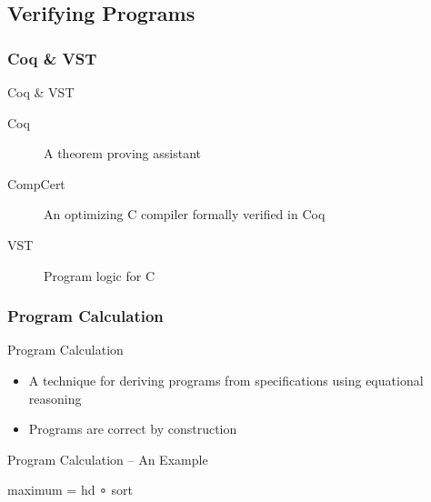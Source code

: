 \documentclass{beamer}
\begin{document}
  \subsection{Verifying Programs}
  \tableofcontents[
    sectionstyle=show/shaded,
    subsectionstyle=show/shaded,
    subsubsectionstyle=show/show/hide/hide,
  ]

  \subsubsection{Coq \& VST}
  \begin{frame}{Coq \& VST}
    \begin{description}
      \item[Coq] A theorem proving assistant
      \item[CompCert] An optimizing C compiler formally verified in
        Coq
      \item[VST] Program logic for C
    \end{description}
  \end{frame}

  \subsubsection{Program Calculation}
  \begin{frame}{Program Calculation}
    \begin{itemize}
    \item<+-> A technique for deriving programs from specifications using
      \alert{equational reasoning}
    \item<+-> Programs are \alert{correct by construction}
    \end{itemize}
  \end{frame}

  \begin{frame}[fragile]{Program Calculation -- An Example}
    \begin{semiverbatim}
maximum = hd ∘ sort

 

 
    \end{semiverbatim}
  \end{frame}
\end{document}
